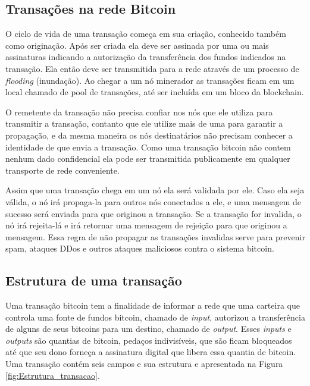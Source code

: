 \documentclass[conference,compsoc]{IEEEtran}
\begin{document}
\subsection{Transações na rede Bitcoin}
\label{section:Transações na rede Bitcoin}

O ciclo de vida de uma transação começa em sua criação, conhecido também como originação. Após ser criada ela deve ser assinada por uma ou mais assinaturas indicando a autorização da transferência dos fundos indicados na transação. Ela então deve ser transmitida para a rede através de um processo de \textit{flooding} (inundação). Ao chegar a um nó minerador as transações ficam em um local chamado de pool de transações, até ser incluída em um bloco da blockchain.

O remetente da transação não precisa confiar nos nós que ele utiliza para transmitir a transação, contanto que ele utilize mais de uma para garantir a propagação, e da mesma maneira os nós destinatários não precisam conhecer a identidade de que envia a transação. Como uma transação bitcoin não contem nenhum dado confidencial ela pode ser transmitida publicamente em qualquer transporte de rede conveniente.

Assim que uma transação chega em um nó ela será validada por ele. Caso ela seja válida, o nó irá propaga-la para outros nós conectados a ele, e uma mensagem de sucesso será enviada para que originou a transação. Se a transação for invalida, o nó irá rejeita-lá e irá retornar uma mensagem de rejeição para que originou a mensagem. Essa regra de não propagar as transações invalidas serve para prevenir spam, ataques DDos e outros ataques maliciosos contra o sistema bitcoin.



\subsection*{Estrutura de uma transação}

Uma transação bitcoin tem a finalidade de informar a rede que uma carteira que controla uma fonte de fundos bitcoin, chamado de \textit{input},  autorizou a transferência de alguns de seus bitcoins para um destino, chamado de \textit{output}. Esses \textit{inputs} e \textit{outputs} são quantias de bitcoin, pedaços indivisíveis, que são ficam bloqueados até que seu dono forneça a assinatura digital que libera essa quantia de bitcoin. Uma transação contém seis campos e sua estrutura e apresentada na Figura \ref{fig:Estrutura_transacao}.
\end{document}

